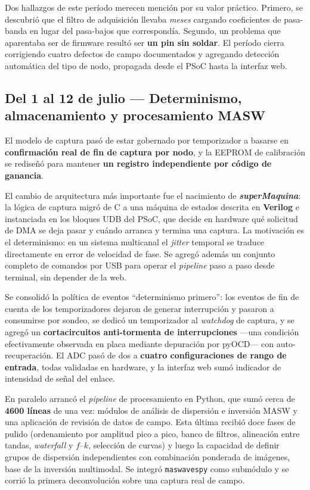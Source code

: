 Dos hallazgos de este per\'iodo merecen menci\'on por su valor pr\'actico. Primero, se
descubri\'o que el filtro de adquisici\'on llevaba \emph{meses} cargando coeficientes de
pasa-banda en lugar del pasa-bajos que correspond\'ia. Segundo, un problema que aparentaba
ser de firmware result\'o ser \textbf{un pin sin soldar}. El per\'iodo cierra corrigiendo
cuatro defectos de campo documentados y agregando detecci\'on autom\'atica del tipo de nodo,
propagada desde el PSoC hasta la interfaz web.

\subsection{Del 1 al 12 de julio --- Determinismo, almacenamiento y procesamiento MASW}

El modelo de captura pas\'o de estar gobernado por temporizador a basarse en
\textbf{confirmaci\'on real de fin de captura por nodo}, y la EEPROM de calibraci\'on se
redise\~n\'o para mantener \textbf{un registro independiente por c\'odigo de ganancia}.

El cambio de arquitectura m\'as importante fue el nacimiento de \textbf{\emph{superMaquina}}:
la l\'ogica de captura migr\'o de C a una m\'aquina de estados descrita en \textbf{Verilog} e
instanciada en los bloques UDB del PSoC, que decide en hardware qu\'e solicitud de DMA se
deja pasar y cu\'ando arranca y termina una captura. La motivaci\'on es el determinismo: en
un sistema multicanal el \emph{jitter} temporal se traduce directamente en error de
velocidad de fase. Se agreg\'o adem\'as un conjunto completo de comandos por USB para operar
el \emph{pipeline} paso a paso desde terminal, sin depender de la web.

Se consolid\'o la pol\'itica de eventos ``determinismo primero'': los eventos de fin de
cuenta de los temporizadores dejaron de generar interrupci\'on y pasaron a consumirse por
sondeo, se dedic\'o un temporizador al \emph{watchdog} de captura, y se agreg\'o un
\textbf{cortacircuitos anti-tormenta de interrupciones} ---una condici\'on efectivamente
observada en placa mediante depuraci\'on por pyOCD--- con auto-recuperaci\'on. El ADC pas\'o
de dos a \textbf{cuatro configuraciones de rango de entrada}, todas validadas en
hardware, y la interfaz web sum\'o indicador de intensidad de se\~nal del enlace.

En paralelo arranc\'o el \emph{pipeline} de procesamiento en Python, que sum\'o cerca de
\textbf{4600 l\'ineas} de una vez: m\'odulos de an\'alisis de dispersi\'on e inversi\'on MASW y
una aplicaci\'on de revisi\'on de datos de campo. Esta \'ultima recibi\'o doce fases de pulido
(ordenamiento por amplitud pico a pico, banco de filtros, alineaci\'on entre tandas,
\emph{waterfall} y $f$--$k$, selecci\'on de curvas) y luego la capacidad de definir grupos
de dispersi\'on independientes con combinaci\'on ponderada de im\'agenes, base de la
inversi\'on multimodal. Se integr\'o \texttt{maswavespy} como subm\'odulo y se corri\'o la
primera deconvoluci\'on sobre una captura real de campo.

